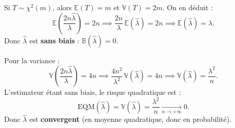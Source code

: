 {\begin{enumerate}
{			Si $T \sim \chi^2(m)$, alors $\mathbb{E}(T) = m$ et $\mathbb{V}(T) = 2m$. On en déduit :
			\[
			\mathbb{E}\!\left(\frac{2n\hat{\lambda}}{\lambda}\right) = 2n
			\implies \frac{2n}{\lambda}\,\mathbb{E}(\hat{\lambda}) = 2n
			\implies \mathbb{E}(\hat{\lambda}) = \lambda.
			\]
			Donc $\hat{\lambda}$ est \textbf{sans biais} : $\mathbb{B}(\hat{\lambda}) = 0$.
			
			Pour la variance :
			\[
			\mathbb{V}\!\left(\frac{2n\hat{\lambda}}{\lambda}\right) = 4n
			\implies \frac{4n^2}{\lambda^2}\,\mathbb{V}(\hat{\lambda}) = 4n
			\implies \mathbb{V}(\hat{\lambda}) = \frac{\lambda^2}{n}.
			\]
			L'estimateur étant sans biais, le risque quadratique est :
			\[
			\mathrm{EQM}(\hat{\lambda}) = \mathbb{V}(\hat{\lambda}) = \frac{\lambda^2}{n} \xrightarrow[n\to+\infty]{} 0.
			\]
			Donc $\hat{\lambda}$ est \textbf{convergent} (en moyenne quadratique, donc en probabilité).
		}
		
	\end{enumerate}
}